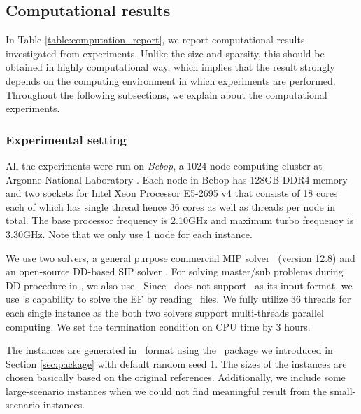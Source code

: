 \subsection{Computational results}
In Table \ref{table:computation_report}, we report computational results investigated from experiments. Unlike the size and sparsity, this should be obtained in highly computational way, which implies that the result strongly depends on the computing environment in which experiments are performed. Throughout the following subsections, we explain about the computational experiments.

\subsubsection{Experimental setting}
All the experiments were run on \textit{Bebop}, a 1024-node computing cluster at Argonne National Laboratory \cite{bebop}. Each node in Bebop has 128GB DDR4 memory and two sockets for Intel Xeon Processor E5-2695 v4 that consists of 18 cores each of which has single thread hence 36 cores as well as threads per node in total. The base processor frequency is 2.10GHz and maximum turbo frequency is 3.30GHz. Note that we only use 1 node for each instance.

We use two solvers, a general purpose commercial MIP solver \cplex\ (version 12.8) and an open-source DD-based SIP solver \dsp. For solving master/sub problems during DD procedure in \dsp, we also use \cplex. Since \cplex\ does not support \smps\ as its input format, we use \dsp's capability to solve the EF by reading \smps\ files. We fully utilize 36 threads for each single instance as the both two solvers support multi-threads parallel computing. We set the termination condition on CPU time by 3 hours. 

The instances are generated in \smps\ format using the \julia\ package we introduced in Section \ref{sec:package} with default random seed 1. The sizes of the instances are chosen basically based on the original references. Additionally, we include some large-scenario instances when we could not find meaningful result from the small-scenario instances.

